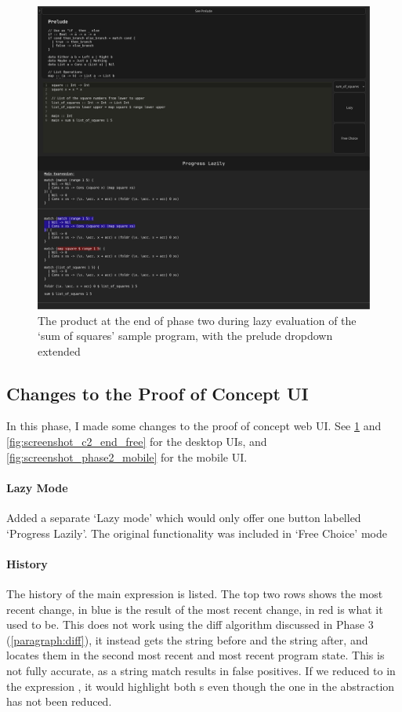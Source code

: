 \begin{figure}[h]
    \centering
    \includegraphics[width=1\linewidth]{images/phase-2-end2.png} 
    \captionsetup{justification=centering}
    \caption{The product at the end of phase two during lazy evaluation of the `sum of squares' sample program, with the prelude dropdown extended}
    \label{fig:screenshot_c2_end}
\end{figure}


\subsection{Changes to the Proof of Concept UI}
\label{c2_poc_ui_impl}
In this phase, I made some changes to the proof of concept web UI. See \ref{fig:screenshot_c2_end} and \ref{fig:screenshot_c2_end_free} for the desktop UIs, and \ref{fig:screenshot_phase2_mobile} for the mobile UI. 

\paragraph{Lazy Mode}
Added a separate `Lazy mode' which would only offer one button labelled `Progress Lazily'. The original functionality was included in `Free Choice' mode

\paragraph{History}
The history of the main expression is listed. The top two rows shows the most recent change, in blue is the result of the most recent change, in red is what it used to be. This does not work using the diff algorithm discussed in Phase 3 (\ref{paragraph:diff}), it instead gets the string before and the string after, and locates them in the second most recent and most recent program state. This is not fully accurate, as a string match results in false positives. If we reduced  to  in the expression , it would highlight both s even though the one in the abstraction has not been reduced. 

